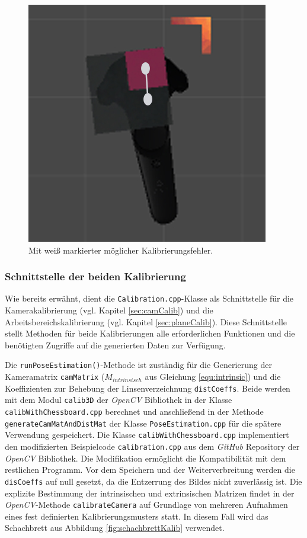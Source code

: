 \begin{figure}
	\centering
	\includegraphics[scale=0.6]{Bilder/Neue Screenshots/Kalibrierungsfehler_OR-KLEIN.jpg}
	\caption{Mit weiß markierter möglicher Kalibrierungsfehler.}
	\label{fig:markierterFehler}
\end{figure}



\subsubsection{Schnittstelle der beiden Kalibrierung} \label{sec:CalibSteuerung}
Wie bereits erwähnt, dient die \texttt{Calibration.cpp}-Klasse als Schnittstelle für die Kamerakalibrierung (vgl. Kapitel \ref{sec:camCalib}) und die Arbeitsbereichskalibrierung (vgl. Kapitel \ref{sec:planeCalib}). Diese Schnittstelle stellt Methoden für beide Kalibrierungen alle erforderlichen Funktionen und die benötigten Zugriffe auf die generierten Daten zur Verfügung. 

Die \texttt{runPoseEstimation()}-Methode ist zuständig für die Generierung der Kameramatrix \texttt{camMatrix}  ($M_{intrinsisch}$ aus Gleichung \ref{equ:intrinsic})  und die Koeffizienten zur Behebung der Linsenverzeichnung \texttt{distCoeffs}. Beide werden mit dem Modul \texttt{calib3D} der \textit{OpenCV} Bibliothek in der Klasse \texttt{calibWithChessboard.cpp} berechnet und anschließend in der Methode \texttt{generateCamMatAndDistMat} der Klasse \texttt{PoseEstimation.cpp} für die spätere  Verwendung gespeichert. 
Die Klasse \texttt{calibWithChessboard.cpp} implementiert den modifizierten Beispielcode \texttt{calibration.cpp} \cite{website:calibexample} aus dem \textit{GitHub} Repository der \textit{OpenCV} Bibliothek. Die Modifikation ermöglicht die Kompatibilität mit dem restlichen Programm. Vor dem Speichern und der Weiterverbreitung werden die \texttt{disCoeffs} auf null gesetzt, da die Entzerrung des Bildes nicht zuverlässig ist. Die explizite Bestimmung der intrinsischen und extrinsischen Matrizen findet in der \textit{OpenCV}-Methode \texttt{calibrateCamera} auf Grundlage von mehreren Aufnahmen eines fest definierten Kalibrierungsmusters statt. In diesem Fall wird das Schachbrett aus Abbildung \ref{fig:schachbrettKalib} verwendet. 

